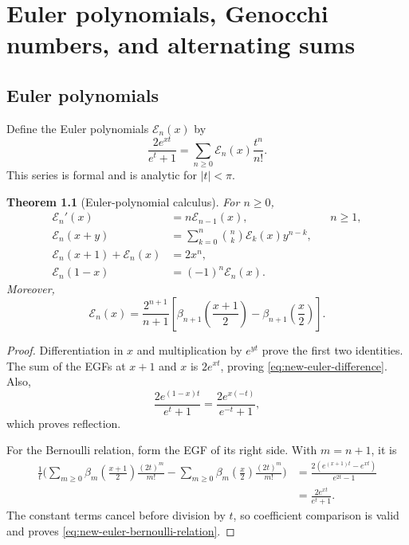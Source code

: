 \documentclass[11pt,a4paper,oneside,openany]{book}
\newtheorem{theorem}{Theorem}[chapter]
\theoremstyle{definition}
\theoremstyle{remark}
\begin{document}
\chapter{Euler polynomials, Genocchi numbers, and alternating sums}
\label{ch:euler-genocchi}

\section{Euler polynomials}

Define the Euler polynomials $\mathcal E_n(x)$ by
\begin{equation}\label{eq:new-euler-polynomial-egf}
 \frac{2e^{xt}}{e^t+1}
 =\sum_{n\ge0}\mathcal E_n(x)\frac{t^n}{n!}.
\end{equation}
This series is formal and is analytic for $|t|<\pi$.

\begin{theorem}[Euler-polynomial calculus]\label{thm:new-euler-basic}
For $n\ge0$,
\begin{align}
 \mathcal E_n'(x)&=n\mathcal E_{n-1}(x), &&n\ge1,
 \label{eq:new-euler-derivative}\\
 \mathcal E_n(x+y)&=\sum_{k=0}^n\binom nk\mathcal E_k(x)y^{n-k},
 \label{eq:new-euler-addition}\\
 \mathcal E_n(x+1)+\mathcal E_n(x)&=2x^n,
 \label{eq:new-euler-difference}\\
 \mathcal E_n(1-x)&=(-1)^n\mathcal E_n(x).
 \label{eq:new-euler-reflection}
\end{align}
Moreover,
\begin{equation}\label{eq:new-euler-bernoulli-relation}
 \boxed{\displaystyle
 \mathcal E_n(x)=\frac{2^{n+1}}{n+1}
 \left[
 \beta_{n+1}\left(\frac{x+1}{2}\right)
 -\beta_{n+1}\left(\frac{x}{2}\right)
 \right].}
\end{equation}
\end{theorem}

\begin{proof}
Differentiation in $x$ and multiplication by $e^{yt}$ prove the first two
identities.  The sum of the EGFs at $x+1$ and $x$ is
$2e^{xt}$, proving \eqref{eq:new-euler-difference}.  Also,
\[
 \frac{2e^{(1-x)t}}{e^t+1}
 =\frac{2e^{x(-t)}}{e^{-t}+1},
\]
which proves reflection.

For the Bernoulli relation, form the EGF of its right side.  With
$m=n+1$, it is
\begin{align*}
 \frac1t\biggl(
 \sum_{m\ge0}\beta_m\left(\frac{x+1}{2}\right)
       \frac{(2t)^m}{m!}
 -\sum_{m\ge0}\beta_m\left(\frac{x}{2}\right)
       \frac{(2t)^m}{m!}\biggr)
 &=\frac{2(e^{(x+1)t}-e^{xt})}{e^{2t}-1}\\
 &=\frac{2e^{xt}}{e^t+1}.
\end{align*}
The constant terms cancel before division by $t$, so coefficient comparison is
valid and proves \eqref{eq:new-euler-bernoulli-relation}.
\end{proof}
\end{document}
